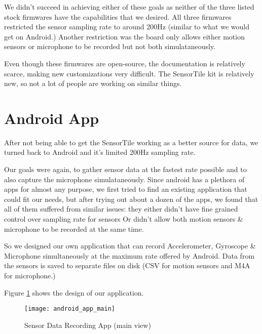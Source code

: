 We didn’t succeed in achieving either of these goals as neither of the three listed stock firmwares have the capabilities that we desired. All three firmwares restricted the sensor sampling rate to around 200Hz (similar to what we would get on Android.) Another restriction was the board only allows either motion sensors or microphone to be recorded but not both simulataneously.

Even though these firmwares are open-source, the documentation is relatively scarce, making new customizations very difficult. The SensorTile kit is relatively new, so not a lot of people are working on similar things.

\newpage
\section{Android App}

After not being able to get the SensorTile working as a better source for data, we turned back to Android and it's limited 200Hz sampling rate.

Our goals were again, to gather sensor data at the fastest rate possible and to also capture the microphone simulataneously. Since android has a plethora of apps for almost any purpose, we first tried to find an existing application that could fit our needs, but after trying out about a dozen of the apps, we found that all of them suffered from similar issues: they either didn’t have fine grained control over sampling rate for sensors Or didn’t allow both motion sensors \& microphone to be recorded at the same time.

So we designed our own application that can record Accelerometer, Gyroscope \& Microphone simultaneously at the maximum rate offered by Android. Data from the sensors is saved to separate files on disk (CSV for motion sensors and M4A for microphone.)

Figure \ref{fig:android_app_main} shows the design of our application.

\begin{figure}[H] \begin{center}
\texttt{[image: android\_app\_main]}
\caption{Sensor Data Recording App (main view)}
\label{fig:android_app_main}
\end{center} \end{figure}
